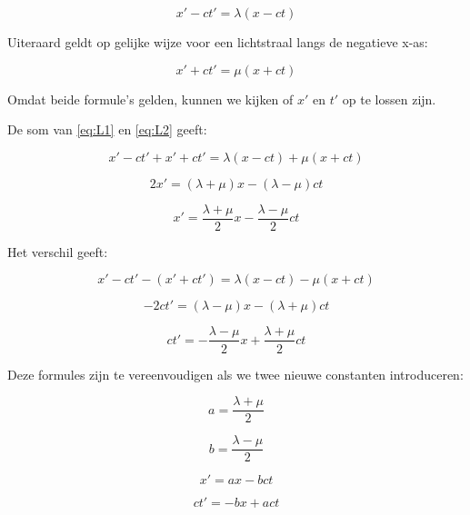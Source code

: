 \begin{equation}
x'-ct'=\lambda(x-ct)\label{eq:L1}
\end{equation}


Uiteraard geldt op gelijke wijze voor een lichtstraal langs de negatieve
x-as:

\begin{equation}
x'+ct'=\mu(x+ct)\label{eq:L2}
\end{equation}


Omdat beide formule's gelden, kunnen we kijken of $x'$ en $t'$ op
te lossen zijn. 

De som van \ref{eq:L1} en \ref{eq:L2} geeft:

\begin{equation}
x'-ct'+x'+ct'=\lambda(x-ct)+\mu(x+ct)
\end{equation}


\begin{equation}
2x'=(\lambda+\mu)x-(\lambda-\mu)ct
\end{equation}


\begin{equation}
x'=\frac{\lambda+\mu}{2}x-\frac{\lambda-\mu}{2}ct
\end{equation}


Het verschil geeft:

\begin{equation}
x'-ct'-(x'+ct')=\lambda(x-ct)-\mu(x+ct)
\end{equation}


\begin{equation}
-2ct'=(\lambda-\mu)x-(\lambda+\mu)ct
\end{equation}


\begin{equation}
ct'=-\frac{\lambda-\mu}{2}x+\frac{\lambda+\mu}{2}ct
\end{equation}


Deze formules zijn te vereenvoudigen als we twee nieuwe constanten
introduceren:

\begin{equation}
a=\frac{\lambda+\mu}{2}
\end{equation}


\begin{equation}
b=\frac{\lambda-\mu}{2}
\end{equation}


\begin{equation}
x'=ax-bct\label{eq:e15}
\end{equation}


\begin{equation}
ct'=-bx+act\label{eq:e16}
\end{equation}


